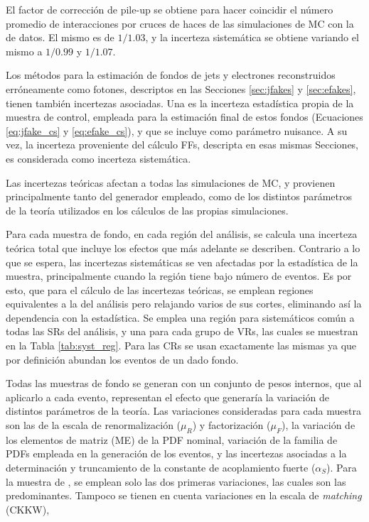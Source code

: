 El factor de corrección de pile-up se obtiene para hacer coincidir el número promedio de interacciones por cruces de haces de las simulaciones de MC con la de datos. El mismo es de $1/1.03$, y la incerteza sistemática se obtiene variando el mismo a $1/0.99$ y $1/1.07$. 



Los métodos para la estimación de fondos de jets y electrones reconstruidos erróneamente como fotones, descriptos en las Secciones \ref{sec:jfakes} y \ref{sec:efakes}, tienen también incertezas asociadas. Una es la incerteza estadística propia de la muestra de control, empleada para la estimación final de estos fondos (Ecuaciones \ref{eq:jfake_cs} y \ref{eq:efake_cs}), y que se incluye como parámetro nuisance. A su vez, la incerteza proveniente del cálculo FFs, descripta en esas mismas Secciones, es considerada como incerteza sistemática.




Las incertezas teóricas afectan a todas las simulaciones de MC, y provienen principalmente tanto del generador empleado, como de los distintos parámetros de la teoría utilizados en los cálculos de las propias simulaciones. 

Para cada muestra de fondo, en cada región del análisis, se calcula una incerteza teórica total que incluye los efectos que más adelante se describen. Contrario a lo que se espera, las incertezas sistemáticas se ven afectadas por la estadística de la muestra, principalmente cuando la región tiene bajo número de eventos. Es por esto, que para el cálculo de las incertezas teóricas, se emplean regiones equivalentes a la del análisis pero relajando varios de sus cortes, eliminando así la dependencia con la estadística. Se emplea una región para sistemáticos común a todas las SRs del análisis, y una para cada grupo de VRs, las cuales se muestran en la Tabla \ref{tab:syst_reg}. Para las CRs se usan exactamente las mismas ya que por definición abundan los eventos de un dado fondo.



Todas las muestras de fondo se generan con un conjunto de pesos internos, que al aplicarlo a cada evento, representan el efecto que generaría la variación de distintos parámetros de la teoría. Las variaciones consideradas para cada muestra son las de la escala de renormalización ($\mu_R$) y factorización ($\mu_F$), la variación de los elementos de matriz (ME) de la PDF nominal, variación de la familia de PDFs empleada en la generación de los eventos, y las incertezas asociadas a la determinación y truncamiento de la constante de acoplamiento fuerte ($\alpha_S$). Para la muestra de \ttbarph, se emplean solo las dos primeras variaciones, las cuales son las predominantes. Tampoco se tienen en cuenta variaciones en la escala de \textit{matching} (CKKW),

